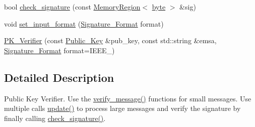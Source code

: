 \begin{DoxyCompactItemize}
bool \hyperlink{classBotan_1_1PK__Verifier_aceccfef940e206b3fc766ad2a5972dc8}{check\-\_\-signature} (const \hyperlink{classBotan_1_1MemoryRegion}{Memory\-Region}$<$ \hyperlink{namespaceBotan_a7d793989d801281df48c6b19616b8b84}{byte} $>$ \&sig)
\item 
void \hyperlink{classBotan_1_1PK__Verifier_a1765c9fb0db16465b324fd6e80b63bbe}{set\-\_\-input\-\_\-format} (\hyperlink{namespaceBotan_ad8a9578625edf847cbcba3ae15648cda}{Signature\-\_\-\-Format} format)
\item 
\hyperlink{classBotan_1_1PK__Verifier_aed77c237e03f46e84dc5478a7fa8635e}{P\-K\-\_\-\-Verifier} (const \hyperlink{classBotan_1_1Public__Key}{Public\-\_\-\-Key} \&pub\-\_\-key, const std\-::string \&emsa, \hyperlink{namespaceBotan_ad8a9578625edf847cbcba3ae15648cda}{Signature\-\_\-\-Format} format=I\-E\-E\-E\-\_)
\end{DoxyCompactItemize}


\subsection{Detailed Description}
Public Key Verifier. Use the \hyperlink{classBotan_1_1PK__Verifier_a4896301365efb244a68b2f4b3e56afe3}{verify\-\_\-message()} functions for small messages. Use multiple calls \hyperlink{classBotan_1_1PK__Verifier_a16bfc86a78f3bb311fd9e78c6ed50722}{update()} to process large messages and verify the signature by finally calling \hyperlink{classBotan_1_1PK__Verifier_ac99869786a0e49521794c7dd5e24aa7a}{check\-\_\-signature()}. 

